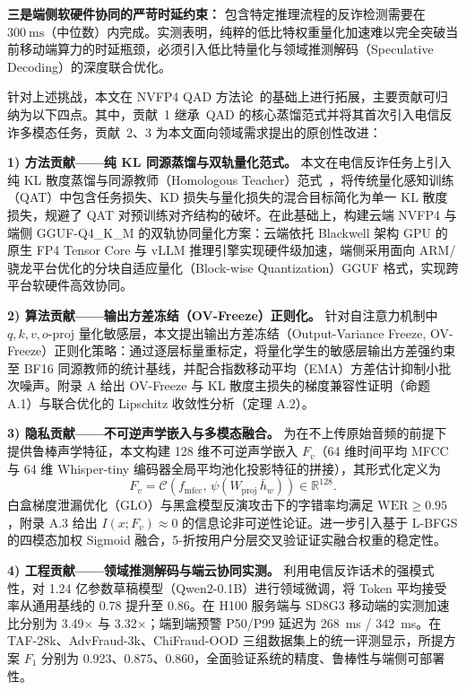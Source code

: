 \documentclass[11pt, a4paper]{article}
\begin{document}
\textbf{三是端侧软硬件协同的严苛时延约束：} 包含特定推理流程的反诈检测需要在 $300~\text{ms}$（中位数）内完成。实测表明，纯粹的低比特权重量化加速难以完全突破当前移动端算力的时延瓶颈，必须引入低比特量化与领域推测解码（Speculative Decoding）的深度联合优化。

针对上述挑战，本文在 NVFP4 QAD 方法论~\cite{3}的基础上进行拓展，主要贡献可归纳为以下四点。其中，贡献~1 继承~QAD 的核心蒸馏范式并将其首次引入电信反诈多模态任务，贡献~2、3 为本文面向领域需求提出的原创性改进：

    \textbf{1) 方法贡献——纯 KL 同源蒸馏与双轨量化范式。} 本文在电信反诈任务上引入纯 KL 散度蒸馏与同源教师（Homologous Teacher）范式~\cite{3}，将传统量化感知训练（QAT）中包含任务损失、KD 损失与量化损失的混合目标简化为单一 KL 散度损失，规避了 QAT 对预训练对齐结构的破坏。在此基础上，构建云端 NVFP4 与端侧 GGUF-Q4\_K\_M 的双轨协同量化方案：云端依托 Blackwell 架构 GPU 的原生 FP4 Tensor Core 与 vLLM 推理引擎实现硬件级加速，端侧采用面向 ARM/骁龙平台优化的分块自适应量化（Block-wise Quantization）GGUF 格式，实现跨平台软硬件高效协同。

    \textbf{2) 算法贡献——输出方差冻结（OV-Freeze）正则化。} 针对自注意力机制中 $q,k,v,o\text{-proj}$ 量化敏感层，本文提出输出方差冻结（Output-Variance Freeze, OV-Freeze）正则化策略：通过逐层标量重标定，将量化学生的敏感层输出方差强约束至 BF16 同源教师的统计基线，并配合指数移动平均（EMA）方差估计抑制小批次噪声。附录 A 给出 OV-Freeze 与 KL 散度主损失的梯度兼容性证明（命题 A.1）与联合优化的 Lipschitz 收敛性分析（定理 A.2）。

    \textbf{3) 隐私贡献——不可逆声学嵌入与多模态融合。} 为在不上传原始音频的前提下提供鲁棒声学特征，本文构建 128 维不可逆声学嵌入 $F_v$（64 维时间平均 MFCC 与 64 维 Whisper-tiny 编码器全局平均池化投影特征的拼接），其形式化定义为
    \begin{equation}
        F_v = \mathcal{C}\!\left( f_{\text{mfcc}},\, \psi(W_{\text{proj}}\,\bar{h}_w) \right) \in \mathbb{R}^{128}.
    \end{equation}
    白盒梯度泄漏优化（GLO）与黑盒模型反演攻击下的字错率均满足 $\text{WER} \ge 0.95$，附录 A.3 给出 $I(x; F_v) \approx 0$ 的信息论非可逆性论证。进一步引入基于 L-BFGS 的四模态加权 Sigmoid 融合，5-折按用户分层交叉验证证实融合权重的稳定性。

    \textbf{4) 工程贡献——领域推测解码与端云协同实测。} 利用电信反诈话术的强模式性，对 1.24 亿参数草稿模型（Qwen2-0.1B）进行领域微调，将 Token 平均接受率从通用基线的 0.78 提升至 0.86。在 H100 服务端与 SD8G3 移动端的实测加速比分别为 3.49$\times$ 与 3.32$\times$；端到端预警 P50/P99 延迟为 268~ms / 342~ms。在 TAF-28k、AdvFraud-3k、ChiFraud-OOD 三组数据集上的统一评测显示，所提方案 $F_1$ 分别为 0.923、0.875、0.860，全面验证系统的精度、鲁棒性与端侧可部署性。
\end{document}
